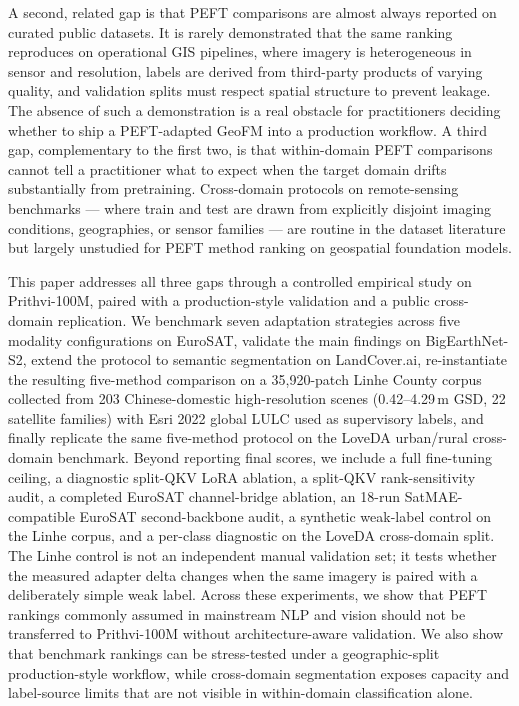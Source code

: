 \documentclass[11pt]{article}
\begin{document}
A second, related gap is that PEFT comparisons are almost always reported on curated public datasets. It is rarely demonstrated that the same ranking reproduces on operational GIS pipelines, where imagery is heterogeneous in sensor and resolution, labels are derived from third-party products of varying quality, and validation splits must respect spatial structure to prevent leakage. The absence of such a demonstration is a real obstacle for practitioners deciding whether to ship a PEFT-adapted GeoFM into a production workflow. A third gap, complementary to the first two, is that within-domain PEFT comparisons cannot tell a practitioner what to expect when the target domain drifts substantially from pretraining. Cross-domain protocols on remote-sensing benchmarks --- where train and test are drawn from explicitly disjoint imaging conditions, geographies, or sensor families --- are routine in the dataset literature but largely unstudied for PEFT method ranking on geospatial foundation models.

This paper addresses all three gaps through a controlled empirical study on Prithvi-100M, paired with a production-style validation and a public cross-domain replication. We benchmark seven adaptation strategies across five modality configurations on EuroSAT, validate the main findings on BigEarthNet-S2, extend the protocol to semantic segmentation on LandCover.ai, re-instantiate the resulting five-method comparison on a 35{,}920-patch Linhe County corpus collected from 203 Chinese-domestic high-resolution scenes (0.42--4.29\,m GSD, 22 satellite families) with Esri 2022 global LULC used as supervisory labels, and finally replicate the same five-method protocol on the LoveDA urban/rural cross-domain benchmark. Beyond reporting final scores, we include a full fine-tuning ceiling, a diagnostic split-QKV LoRA ablation, a split-QKV rank-sensitivity audit, a completed EuroSAT channel-bridge ablation, an 18-run SatMAE-compatible EuroSAT second-backbone audit, a synthetic weak-label control on the Linhe corpus, and a per-class diagnostic on the LoveDA cross-domain split. The Linhe control is not an independent manual validation set; it tests whether the measured adapter delta changes when the same imagery is paired with a deliberately simple weak label. Across these experiments, we show that PEFT rankings commonly assumed in mainstream NLP and vision should not be transferred to Prithvi-100M without architecture-aware validation. We also show that benchmark rankings can be stress-tested under a geographic-split production-style workflow, while cross-domain segmentation exposes capacity and label-source limits that are not visible in within-domain classification alone.
\end{document}

